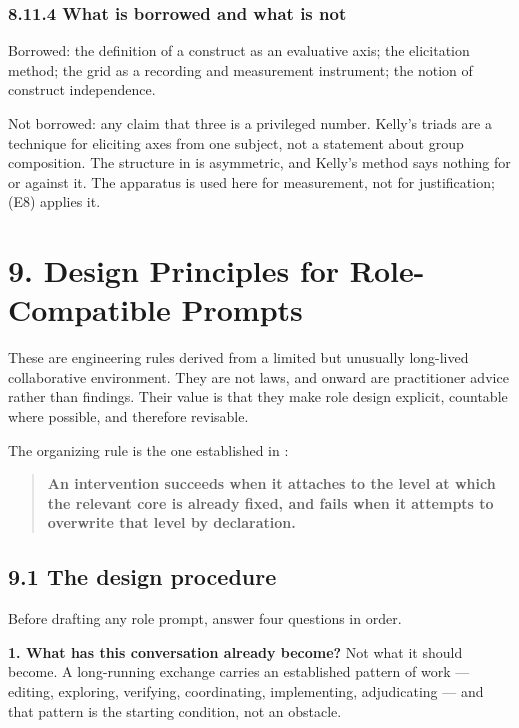 \subsubsection*{8.11.4 What is borrowed and what is not}
\label{sec:en:8.11.4}

Borrowed: the definition of a construct as an evaluative axis; the elicitation method; the grid as a recording and measurement instrument; the notion of construct independence.

Not borrowed: any claim that three is a privileged number. Kelly's triads are a technique for eliciting axes from one subject, not a statement about group composition. The structure in  is asymmetric, and Kelly's method says nothing for or against it. The apparatus is used here for measurement, not for justification;  (E8) applies it.


\section*{9. Design Principles for Role-Compatible Prompts}
\label{sec:en:9}

These are engineering rules derived from a limited but unusually long-lived collaborative environment. They are not laws, and  onward are practitioner advice rather than findings. Their value is that they make role design explicit, countable where possible, and therefore revisable.

The organizing rule is the one established in :

\begin{quote}
\textbf{An intervention succeeds when it attaches to the level at which the relevant core is already fixed, and fails when it attempts to overwrite that level by declaration.}
\end{quote}

\subsection*{9.1 The design procedure}
\label{sec:en:9.1}

Before drafting any role prompt, answer four questions in order.

\textbf{1. What has this conversation already become?} Not what it should become. A long-running exchange carries an established pattern of work — editing, exploring, verifying, coordinating, implementing, adjudicating — and that pattern is the starting condition, not an obstacle.

